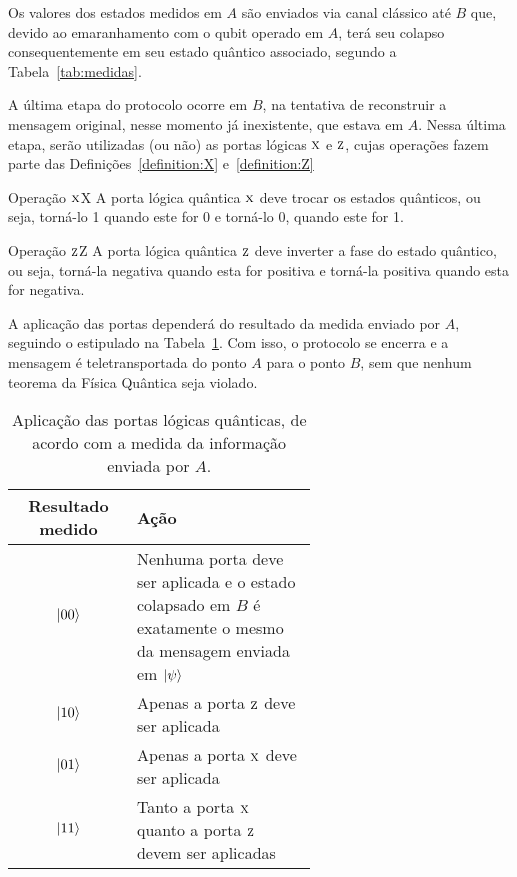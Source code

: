 Os valores dos estados medidos em \(A\) são enviados via canal clássico até \(B\) que, devido ao emaranhamento com o qubit operado em \(A\), terá seu colapso consequentemente em seu estado quântico associado, segundo a Tabela~\ref{tab:medidas}.

A última etapa do protocolo ocorre em \(B\), na tentativa de reconstruir a mensagem original, nesse momento já inexistente, que estava em \(A\). Nessa última etapa, serão utilizadas (ou não) as portas lógicas \(\operatorname{\textsc{x}}\) e \(\operatorname{\textsc{z}}\), cujas operações fazem parte das Definições~\ref{definition:X} e~\ref{definition:Z}

\begin{definition}{Operação \(\operatorname{\textsc{x}}\)}{X}
A porta lógica quântica \(\operatorname{\textsc{x}}\) deve trocar os estados quânticos, ou seja, torná-lo 1 quando este for 0 e torná-lo 0, quando este for 1.
\end{definition}


\begin{definition}{Operação \(\operatorname{\textsc{z}}\)}{Z}
A porta lógica quântica \(\operatorname{\textsc{z}}\) deve inverter a fase do estado quântico, ou seja, torná-la negativa quando esta for positiva e torná-la positiva quando esta for negativa.
\end{definition}

A aplicação das portas dependerá do resultado da medida enviado por \(A\), seguindo o estipulado na Tabela~\ref{tab:acao-das-portas}. Com isso, o protocolo se encerra e a mensagem é teletransportada do ponto \(A\) para o ponto \(B\), sem que nenhum teorema da Física Quântica seja violado.

\begin{table}[ht!]
  \centering
  \caption{Aplicação das portas lógicas quânticas, de acordo com a medida da informação enviada por \(A\).}\label{tab:acao-das-portas}
  \begin{tabular}{cp{0.6\linewidth}}
    \toprule
    Resultado medido & Ação \\
    \midrule
    $\ket{00}$ & Nenhuma porta deve ser aplicada e o estado colapsado em \(B\) é exatamente o mesmo da mensagem enviada em $\ket{\psi}$ \\
    $\ket{10}$ & Apenas a porta \(\operatorname{\textsc{z}}\) deve ser aplicada \\
    $\ket{01}$ & Apenas a porta \(\operatorname{\textsc{x}}\) deve ser aplicada \\
    $\ket{11}$ & Tanto a porta \(\operatorname{\textsc{x}}\) quanto a porta \(\operatorname{\textsc{z}}\) devem ser aplicadas \\
    \bottomrule
  \end{tabular}
\end{table}


